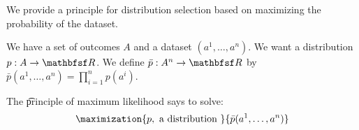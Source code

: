 

We provide a principle for distribution selection based on maximizing the probability of the dataset.


We have a set of outcomes $A$ and
a dataset $(a^1, \dots, a^n)$.
We want a distribution $p: A \to \R$.
We define $\bar{p}: A^n \to \R$ by
$\bar{p}(a^1, \dots, a^n) = \prod_{i = 1}^{n} p(a^i)$.

The \t{principle of maximum likelihood} says to solve:
\[
  \maximization{p, \text{ a distribution }}{\bar{p}(a^1, \dots, a^n)}
\]

\blankpage
